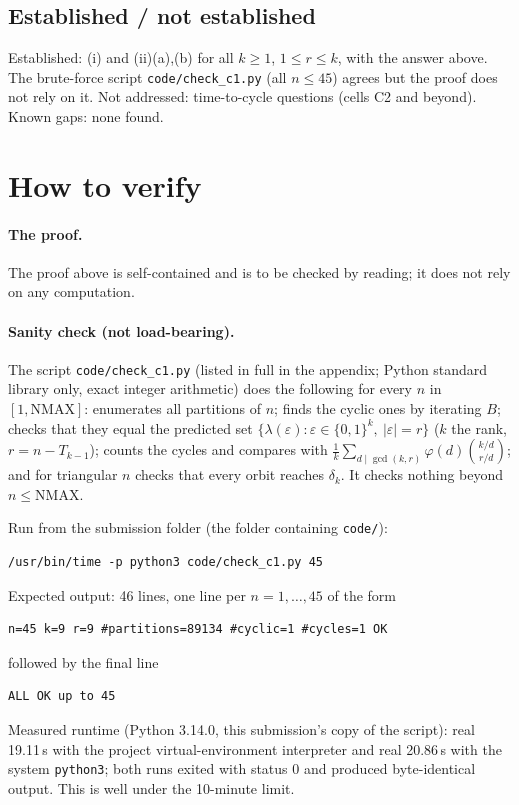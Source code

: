 \documentclass[11pt]{article}
\begin{document}
\subsection*{Established / not established}

Established: (i) and (ii)(a),(b) for all $k\ge1$, $1\le r\le k$, with the answer above. The brute-force script
\texttt{code/check\_c1.py} (all $n\le45$) agrees but the proof does not rely on it. Not addressed: time-to-cycle
questions (cells C2 and beyond). Known gaps: none found.

\section{How to verify}\label{sec:verify}

\paragraph{The proof.} The proof above is self-contained and is to be checked by reading; it does not rely on any
computation.

\paragraph{Sanity check (not load-bearing).} The script \texttt{code/check\_c1.py} (listed in full in the
appendix; Python standard library only, exact integer arithmetic) does the following for every $n$ in
$[1,\mathrm{NMAX}]$: enumerates all partitions of $n$; finds the cyclic ones by iterating $B$; checks that they
equal the predicted set $\{\lambda(\varepsilon):\varepsilon\in\{0,1\}^k,\ |\varepsilon|=r\}$ ($k$ the rank,
$r=n-T_{k-1}$); counts the cycles and compares with $\frac1k\sum_{d\mid\gcd(k,r)}\varphi(d)\binom{k/d}{r/d}$;
and for triangular $n$ checks that every orbit reaches $\delta_k$. It checks nothing beyond $n\le\mathrm{NMAX}$.

Run from the submission folder (the folder containing \texttt{code/}):
\begin{verbatim}
/usr/bin/time -p python3 code/check_c1.py 45
\end{verbatim}
Expected output: 46 lines, one line per $n=1,\ldots,45$ of the form
\begin{verbatim}
n=45 k=9 r=9 #partitions=89134 #cyclic=1 #cycles=1 OK
\end{verbatim}
followed by the final line
\begin{verbatim}
ALL OK up to 45
\end{verbatim}
Measured runtime (Python 3.14.0, this submission's copy of the script): real 19.11\,s with the project
virtual-environment interpreter and real 20.86\,s with the system \texttt{python3}; both runs exited with
status 0 and produced byte-identical output. This is well under the 10-minute limit.
\end{document}
